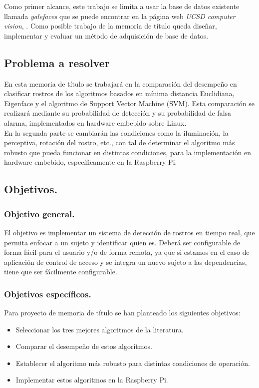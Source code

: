 \documentclass[letterpaper,12pt]{article}
\begin{document}
Como primer alcance, este trabajo se limita a usar la base de datos existente llamada \emph{yalefaces} que se puede encontrar en la página web \emph{UCSD computer vision}, \cite{yaleface}. Como posible trabajo de la memoria de título queda diseñar, implementar y evaluar un método de adquisición de base de datos.
\subsection{Problema a resolver}
En esta memoria de título se trabajará en la comparación del desempeño en clasificar rostros de los algoritmos basados en mínima distancia Euclidiana, Eigenface y el algoritmo de Support Vector Machine (SVM). Esta comparación se realizará mediante su probabilidad de detección y su probabilidad de falsa alarma, implementados en hardware embebido sobre Linux.\\
En la segunda parte se cambiarán las condiciones como la iluminación, la perceptiva, rotación del rostro, etc., con tal de determinar el algoritmo más robusto que pueda funcionar en distintas condiciones, para la implementación en hardware embebido, específicamente en la Raspberry Pi.



\subsection{Objetivos.}

\subsubsection{Objetivo general.}%

El objetivo es implementar un sistema de detección de rostros en tiempo real, que permita enfocar a un sujeto y identificar quien es. Deberá ser configurable de forma fácil para el usuario y/o de forma remota, ya que si estamos en el caso de aplicación de control de acceso y se integra un nuevo sujeto a las dependencias, tiene que ser fácilmente configurable.


\subsubsection{Objetivos específicos.}
Para proyecto de memoria de título se han planteado los siguientes objetivos:
\begin{itemize}
\item Seleccionar los tres mejores algoritmos de la literatura.
\item Comparar el desempeño de estos algoritmos.
\item Establecer el algoritmo más robusto para distintas condiciones de operación.
\item Implementar estos algoritmos en la Raspberry Pi.
\end{itemize}
\end{document}
